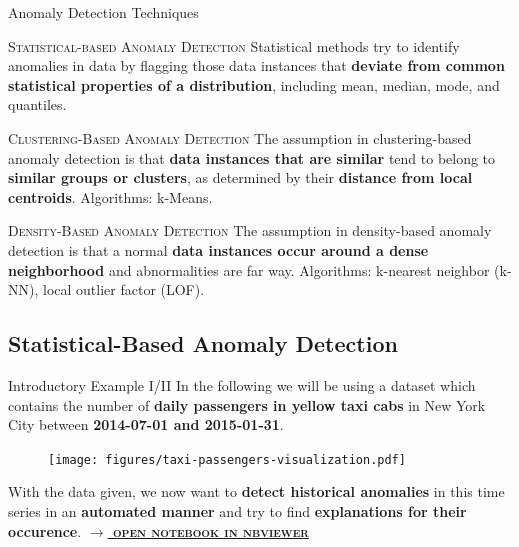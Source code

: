 \documentclass[document.tex]{subfiles}
\begin{document}
    \begin{frame}{Anomaly Detection Techniques}
        \begin{alertblock}{\textsc{Statistical-based Anomaly Detection}}
        Statistical methods try to identify anomalies in data by flagging those data instances that \textbf{deviate from common statistical properties of a distribution}, including mean, median, mode, and quantiles.
        \end{alertblock}
    
        \begin{alertblock}{\textsc{Clustering-Based Anomaly Detection}}
            The assumption in clustering-based anomaly detection is that \textbf{data instances that are similar} tend to belong to \textbf{similar groups or clusters}, as determined by their \textbf{distance from local centroids}. Algorithms: k-Means.
        \end{alertblock}
    
        \begin{alertblock}{\textsc{Density-Based Anomaly Detection}}
        The assumption in density-based anomaly detection is that a normal \textbf{data instances occur around a dense neighborhood} and abnormalities are far way. Algorithms: k-nearest neighbor (k-NN), local outlier factor (LOF).
        \end{alertblock}
    \end{frame}

    \subsection{Statistical-Based Anomaly Detection}

    \begin{frame}{Introductory Example I/II}
        In the following we will be using a dataset which contains the number of \textbf{daily passengers in yellow taxi cabs} in New York City between \textbf{2014-07-01 and 2015-01-31}.
        \begin{figure}
            \label{taxi-passengers-visualization}
            \texttt{[image: figures/taxi-passengers-visualization.pdf]}
        \end{figure}
        With the data given, we now want to \textbf{detect historical anomalies} in this time series in an \textbf{automated manner} and try to find \textbf{explanations for their occurence}. \href{https://nbviewer.jupyter.org/github/saschaschworm/big-data-and-data-science/blob/master/notebooks/demos/taxi-passengers-low-pass-filter.ipynb}{\textsc{\textbf{$\rightarrow$ open notebook in nbviewer}}}
    \end{frame}
    
\end{document}
